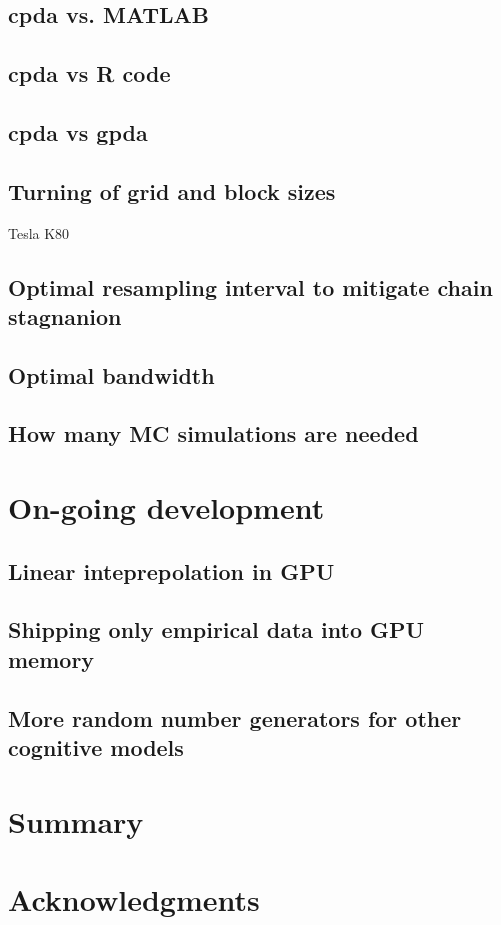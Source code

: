 \documentclass[shortnames,nojss,article]{jss}
\begin{document}
\subsection{cpda vs. MATLAB}

\subsection{cpda vs R code}

\subsection{cpda vs gpda}

\subsection{Turning of grid and block sizes}

Tesla K80

\subsection{Optimal resampling interval to mitigate chain stagnanion}

\subsection{Optimal bandwidth}

\subsection{How many MC simulations are needed}

\section{On-going development}
\label{sec:ongoing}

\subsection{Linear inteprepolation in GPU}

\subsection{Shipping only empirical data into GPU memory}

\subsection{More random number generators for other cognitive models}

\section{Summary}

\section*{Acknowledgments}



\vspace*{-0.35cm}
\end{document}
